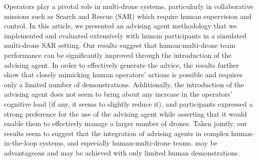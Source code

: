 Operators play a pivotal role in multi-drone systems, particularly in collaborative missions such as Search and Rescue (SAR) which require human supervision and control. In this article, we presented an advising agent methodology that we implemented and evaluated extensively with human participants in a simulated multi-drone SAR setting. Our results suggest that human-multi-drone team performance can be significantly improved through the introduction of the advising agent. In order to effectively generate the advice, the results further show that closely mimicking human operators' actions is possible and requires only a limited number of demonstrations. Additionally, the introduction of the advising agent does not seem to bring about any increase in the operators' cognitive load (if any, it seems to slightly reduce it),  and participants expressed a strong preference for the use of the advising agent while asserting that it would enable them to effectively manage a larger number of drones. Taken jointly, our results seem to suggest that the integration of advising agents in complex human-in-the-loop systems, and especially human-multi-drone teams, may be advantageous and may be achieved with only limited human demonstrations. 


